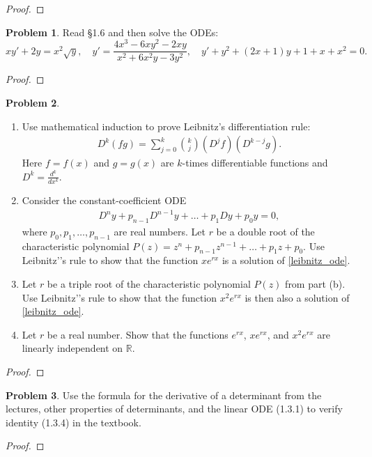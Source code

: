\documentclass[12pt]{article}
\theoremstyle{definition}
\newtheorem{problem}{Problem}
\begin{document}
\begin{proof}
\end{proof}
\newpage


\begin{problem}
  Read \S1.6 and then solve the ODEs:
  $$xy' + 2y = x^2\sqrt{y}, \quad y' = \frac{4x^3-6xy^2-2xy}{x^2+6x^2y-3y^2}, \quad y' + y^2 +(2x+1)y + 1 + x + x^2 = 0.$$
\end{problem}

\begin{proof}
\end{proof}
\newpage


\begin{problem}
  \begin{enumerate}
    \item Use mathematical induction to prove Leibnitz's differentiation rule:
      \begin{align*}
        D^{k}(fg) = \sum_{j=0}^k \binom{k}{j}(D^j f) (D^{k-j}g).
      \end{align*}
      Here $f = f(x)$ and $g=g(x)$ are $k$-times differentiable functions and $D^k = \frac{d^k}{dx^k}$.
    \item Consider the constant-coefficient ODE
      \begin{align}\label{leibnitz_ode}
        D^n y + p_{n-1}D^{n-1}y + \dots + p_1 Dy + p_0 y = 0,
      \end{align}
      where $p_0, p_1, \dots, p_{n-1}$ are real numbers. Let $r$ be a double root of the characteristic polynomial
      $P(z) = z^n + p_{n-1} z^{n-1} + \dots + p_1 z + p_0.$ Use Leibnitz’'s rule to
      show that the function $xe^{rx}$ is a solution of \eqref{leibnitz_ode}.
    \item Let $r$ be a triple root of the characteristic polynomial $P(z)$ from part (b).
      Use Leibnitz'’s rule to show that the function $x^2 e^{rx}$
      is then also a solution of \eqref{leibnitz_ode}.
    \item Let $r$ be a real number. Show that the functions $e^{rx}$, $xe^{rx}$, and $x^2 e^{rx}$
      are linearly independent on $\mathbb{R}$.
  \end{enumerate}
\end{problem}

\begin{proof}
\end{proof}
\newpage


\begin{problem}
  Use the formula for the derivative of a determinant from the lectures, other
  properties of determinants, and the linear ODE (1.3.1) to verify identity
  (1.3.4) in the textbook.
\end{problem}

\begin{proof}
\end{proof}
\end{document}
